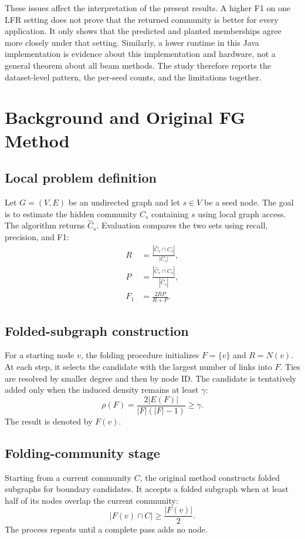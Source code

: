 \documentclass[10pt,journal,compsoc]{IEEEtran}
\begin{document}
These issues affect the interpretation of the present results. A higher F1 on
one LFR setting does not prove that the returned community is better for every
application. It only shows that the predicted and planted memberships agree
more closely under that setting. Similarly, a lower runtime in this Java
implementation is evidence about this implementation and hardware, not a
general theorem about all beam methods. The study therefore reports the
dataset-level pattern, the per-seed counts, and the limitations together.

\section{Background and Original FG Method}
\subsection{Local problem definition}
Let $G=(V,E)$ be an undirected graph and let $s\in V$ be a seed node. The goal
is to estimate the hidden community $C_s$ containing $s$ using local graph
access. The algorithm returns $\widehat{C}_s$. Evaluation compares the two
sets using recall, precision, and F1:
\begin{align}
 R &= \frac{|\widehat{C}_s\cap C_s|}{|C_s|},\\
 P &= \frac{|\widehat{C}_s\cap C_s|}{|\widehat{C}_s|},\\
 F_1 &= \frac{2RP}{R+P}.
\end{align}

\subsection{Folded-subgraph construction}
For a starting node $v$, the folding procedure initializes $F=\{v\}$ and
$R=N(v)$. At each step, it selects the candidate with the largest number of
links into $F$. Ties are resolved by smaller degree and then by node ID. The
candidate is tentatively added only when the induced density remains at least
$\gamma$:
\begin{equation}
 \rho(F)=\frac{2|E(F)|}{|F|(|F|-1)} \geq \gamma.
\end{equation}
The result is denoted by $F(v)$.

\subsection{Folding-community stage}
Starting from a current community $C$, the original method constructs folded
subgraphs for boundary candidates. It accepts a folded subgraph when at least
half of its nodes overlap the current community:
\begin{equation}
 |F(v)\cap C| \geq \frac{|F(v)|}{2}.
\end{equation}
The process repeats until a complete pass adds no node.
\end{document}
